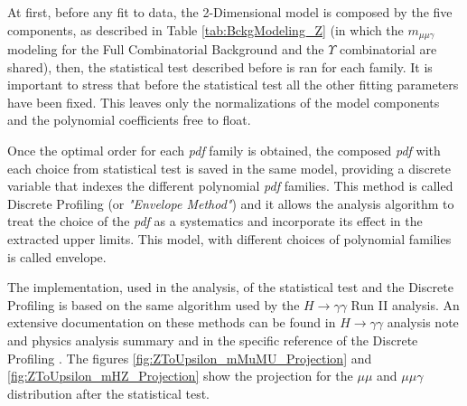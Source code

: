 At first, before any fit to data, the 2-Dimensional model is composed by the five components, as described in Table \ref{tab:BckgModeling_Z} (in which the $m_{\mu\mu\gamma}$ modeling for the Full Combinatorial Background and the $\Upsilon$ combinatorial are shared), then, the statistical test described before is ran for each family. It is important to stress that before the statistical test all the other fitting parameters have been fixed. This leaves only the normalizations of the model components and the polynomial coefficients free to float.

Once the optimal order for each \textit{pdf} family is obtained, the composed \textit{pdf} with each choice from statistical test is saved in the same model, providing a discrete variable that indexes the different polynomial \textit{pdf} families. This method is called Discrete Profiling (or \textit{"Envelope Method"}) and it allows the analysis algorithm to treat the choice of the \textit{pdf} as a systematics and incorporate its effect in the extracted upper limits. This model, with different choices of polynomial families is called envelope.

The implementation, used in the analysis, of the statistical test and the Discrete Profiling is based on the same algorithm used by the $H \rightarrow \gamma\gamma$ Run II analysis. An extensive documentation on these methods can be found in $H \rightarrow \gamma\gamma$ analysis note and physics analysis summary \cite{higgs_gammagamma_AN, higgs_gammagamma_PAS} and in the specific reference of the Discrete Profiling \cite{DiscreteProfilingMethod}. The figures \ref{fig:ZToUpsilon_mMuMU_Projection} and \ref{fig:ZToUpsilon_mHZ_Projection} show the projection for the $\mu\mu$ and $\mu\mu\gamma$ distribution after the statistical test.

